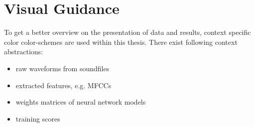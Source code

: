 \section{Visual Guidance}
To get a better overview on the presentation of data and results, context specific color color-schemes are used within this thesis.
There exist following context abstractions:

\begin{itemize}
    \item raw waveforms from soundfiles
    \item extracted features, e.g. MFCCs
    \item weights matrices of neural network models
    \item training scores
\end{itemize}
